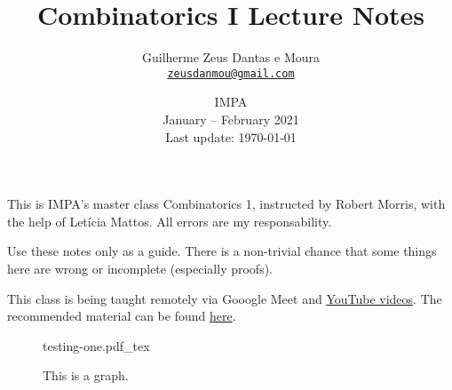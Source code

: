 \documentclass[a4paper, 10pt]{article}
\title{\sffamily \bfseries Combinatorics I Lecture Notes}
\author{\sc Guilherme Zeus Dantas e Moura\\\href{mailto:zeusdanmou@gmail.com}{\texttt{zeusdanmou@gmail.com}}}
\date{IMPA\\[3pt] January -- February 2021\\[3pt] Last update: \today}
\newcommand{\incfig}[2][1]{%
    \def\svgwidth{#1\columnwidth}
    {#2.pdf_tex}
}
\begin{document}
    \maketitle
	\sloppy
	
		This is IMPA's master class Combinatorics 1, instructed by Robert Morris, with the help of Letícia Mattos.
		All errors are my responsability.

		Use these notes only as a guide. There is a non-trivial chance that some things here are wrong or incomplete (especially proofs).

		This class is being taught remotely via Gooogle Meet and \href{https://www.youtube.com/playlist?list=PLo4jXE-LdDTSkmHd3xNGhcObfWXvpwmCL}{YouTube videos}. The recommended material can be found \href{https://impa.br/wp-content/uploads/2017/04/28CBM_04.pdf}{here}.

		\hfill

		\begin{figure}[h]
			\centering
			\incfig[.8]{testing-one}
			\caption{This is a graph.}
			\label{fig:testing-one}
		\end{figure}

		\hfill

	\newpage
	\tableofcontents

	\newpage
    
    
    
    
    
    
    
    
    
    
    
\end{document}
